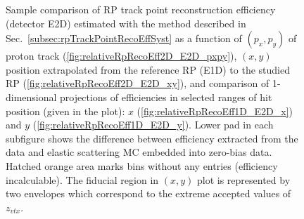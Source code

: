 \begin{figure}[h]
{\begin{subfigure}[b]{\linewidth}
		\end{subfigure}
	}
	\caption[Coparison of estimated RP track point reconstruction efficiency in 2D and 1D (detector E2D).]%
	{Sample comparison of RP track point reconstruction efficiency (detector E2D) estimated with the method described in Sec.~\ref{subsec:rpTrackPointRecoEffSyst} as a function of $(p_{x},p_{y})$ of proton track (\ref{fig:relativeRpRecoEff2D_E2D_pxpy}), $(x,y)$ position extrapolated from the reference RP (E1D) to the studied RP (\ref{fig:relativeRpRecoEff2D_E2D_xy}), and comparison of 1-dimensional projections of efficiencies in selected ranges of hit position (given in the plot): $x$ (\ref{fig:relativeRpRecoEff1D_E2D_x}) and $y$ (\ref{fig:relativeRpRecoEff1D_E2D_y}). Lower pad in each subfigure shows the difference between efficiency extracted from the data and elastic scattering MC embedded into zero-bias data. Hatched orange area marks bins without any entries (efficiency incalculable). The fiducial region in $(x,y)$ plot is represented by two envelopes which correspond to the extreme accepted values of $z_{vtx}$.%
	}\label{fig:relativeRpRecoEff_E2D}
\end{figure}







